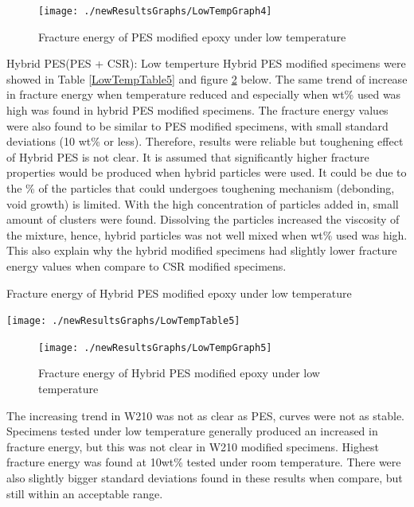 \documentclass[numbers=noendperiod,chapterprefix=on]{icldt} %
\begin{document}
{\begin{figure}[!hp]
\centering
\texttt{[image: ./newResultsGraphs/LowTempGraph4]}
\caption{Fracture energy of PES modified epoxy under low temperature}\label{LowTempGraph4}
\end{figure}
\FloatBarrier
\newpage
Hybrid PES(PES + CSR):
Low temperture Hybrid PES modified specimens were showed in Table \ref{LowTempTable5} and figure \ref{LowTempGraph5} below.
The same trend of increase in fracture energy when temperature reduced and especially when wt\% used was high was found in hybrid PES modified specimens. The fracture energy values were also found to be similar to PES modified specimens, with small standard deviations (10 wt\% or less). Therefore, results were reliable but toughening effect of Hybrid PES is not clear. It is assumed that significantly higher fracture properties would be produced when hybrid particles were used. It could be due to the \% of the particles that could undergoes toughening mechanism (debonding, void growth) is limited. With the high concentration of particles added in, small amount of clusters were found. Dissolving the particles increased the viscosity of the mixture, hence, hybrid particles was not well mixed when wt\% used was high. This also explain why the hybrid modified specimens had slightly lower fracture energy values when compare to CSR modified specimens.

\begin{table}[!hp]
\centering
\caption{Fracture energy of Hybrid PES modified epoxy under low temperature} \label{LowTempTable5}
\texttt{[image: ./newResultsGraphs/LowTempTable5]}
\end{table}
\FloatBarrier

\begin{figure}[!hp]
\centering
\texttt{[image: ./newResultsGraphs/LowTempGraph5]}
\caption{Fracture energy of Hybrid PES modified epoxy under low temperature}\label{LowTempGraph5}
\end{figure}
\FloatBarrier

The increasing trend in W210 was not as clear as PES, curves were not as stable. Specimens tested under low temperature generally produced an increased in fracture energy, but this was not clear in W210 modified specimens. Highest fracture energy was found at 10wt\% tested under room temperature. There were also slightly bigger standard deviations found in these results when compare, but still within an acceptable range.  


}
\end{document}

